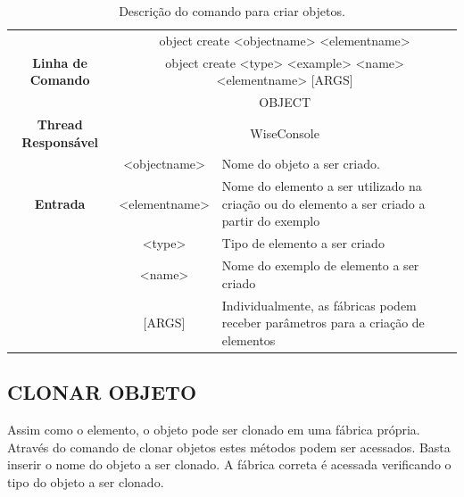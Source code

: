 \begin{center}
	\begin{table}[!htbp]
		\begin{tabularx}{\textwidth}{c|c|X}
			\toprule
			\multirow{3}{*}{\textbf{Linha de Comando}} & \multicolumn{2}{X}{object create <object\underline{\space\space}name> <element\underline{\space\space}name>} \\
			& \multicolumn{2}{c}{object create <type> <example> <name> <element\underline{\space\space}name> [ARGS]} \\
			\midrule
			\textbf{Escopo} & \multicolumn{2}{c}{OBJECT} \\
			\hline
			\textbf{Thread Responsável} & \multicolumn{2}{c}{WiseConsole} \\
			\hline
			\multirow{3}{*}{\textbf{Entrada}} & <object\underline{\space\space}name> & Nome do objeto a ser criado. \\
			& <element\underline{\space\space}name> & Nome do elemento a ser utilizado na criação ou do elemento a ser criado a partir do exemplo \\
			& <type> & Tipo de elemento a ser criado \\
			& <name> & Nome do exemplo de elemento a ser criado \\
			& [ARGS] & Individualmente,  as fábricas podem receber parâmetros para a criação de elementos \\
			\bottomrule
		\end{tabularx}
		\caption{Descrição do comando para criar objetos.}
		\label{tab:create_object}
	\end{table}
\end{center}

\subsection{CLONAR OBJETO}\label{sec:clone_object}

Assim como o elemento, o objeto pode ser clonado em uma fábrica própria. Através do comando de clonar objetos estes métodos podem ser acessados. Basta inserir o nome do objeto a ser clonado. A fábrica correta é acessada verificando o tipo do objeto a ser clonado.

